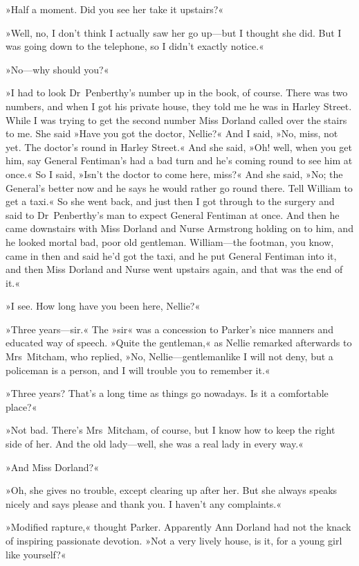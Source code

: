 »Half a moment. Did you see her take it upstairs?«

»Well, no, I don't think I actually saw her go up—but I thought she did. But I was going down to the telephone, so I didn't exactly notice.«

»No—why should you?«

»I had to look Dr~Penberthy's number up in the book, of course. There was two numbers, and when I got his private house, they told me he was in Harley Street. While I was trying to get the second number Miss Dorland called over the stairs to me. She said »Have you got the doctor, Nellie?« And I said, »No, miss, not yet. The doctor's round in Harley Street.« And she said, »Oh! well, when you get him, say General Fentiman's had a bad turn and he's coming round to see him at once.« So I said, »Isn't the doctor to come here, miss?« And she said, »No; the General's better now and he says he would rather go round there. Tell William to get a taxi.« So she went back, and just then I got through to the surgery and said to Dr~Penberthy's man to expect General Fentiman at once. And then he came downstairs with Miss Dorland and Nurse Armstrong holding on to him, and he looked mortal bad, poor old gentleman. William—the footman, you know, came in then and said he'd got the taxi, and he put General Fentiman into it, and then Miss Dorland and Nurse went upstairs again, and that was the end of it.«

»I see. How long have you been here, Nellie?«

»Three years—sir.« The »sir« was a concession to Parker's nice manners and educated way of speech. »Quite the gentleman,« as Nellie remarked afterwards to Mrs~Mitcham, who replied, »No, Nellie—gentlemanlike I will not deny, but a policeman is a person, and I will trouble you to remember it.«

»Three years? That's a long time as things go nowadays. Is it a comfortable place?«

»Not bad. There's Mrs~Mitcham, of course, but I know how to keep the right side of her. And the old lady—well, she was a real lady in every way.«

»And Miss Dorland?«

»Oh, she gives no trouble, except clearing up after her. But she always speaks nicely and says please and thank you. I haven't any complaints.«

»Modified rapture,« thought Parker. Apparently Ann Dorland had not the knack of inspiring passionate devotion. »Not a very lively house, is it, for a young girl like yourself?«


